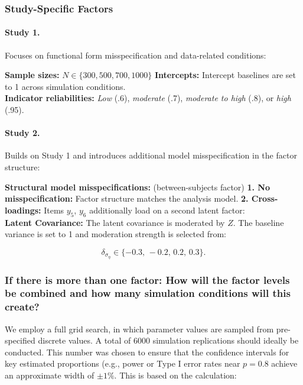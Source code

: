 \documentclass[
  man,
  floatsintext]{apa7}
\begin{document}
\subsubsection{Study-Specific Factors}\label{study-specific-factors}

\paragraph{Study 1.}\label{study-1.}

Focuses on functional form misspecification and data-related conditions:

\textbf{Sample sizes:} \(N \in \{300, 500, 700, 1000\}\)
\textbf{Intercepts:} Intercept baselines are set to 1 across simulation
conditions.\\
\textbf{Indicator reliabilities:} \emph{Low} (.6), \emph{moderate} (.7),
\emph{moderate to high} (.8), or \emph{high} (.95).

\paragraph{Study 2.}\label{study-2.}

Builds on Study 1 and introduces additional model misspecification in
the factor structure:

\textbf{Structural model misspecifications:} (between-subjects factor)
\textbf{1. No misspecification:} Factor structure matches the analysis
model. \textbf{2. Cross-loadings:} Items \(y_5\), \(y_6\) additionally
load on a second latent factor:\\
\textbf{Latent Covariance:} The latent covariance is moderated by \(Z\).
The baseline variance is set to 1 and moderation strength is selected
from:

\[
\delta_{\sigma_\eta} \in \{-0.3,\,-0.2,\,0.2,\,0.3\}.
\]

\subsubsection{If there is more than one factor: How will the factor
levels be combined and how many simulation conditions will this
create?}\label{if-there-is-more-than-one-factor-how-will-the-factor-levels-be-combined-and-how-many-simulation-conditions-will-this-create}

We employ a full grid search, in which parameter values are sampled from
pre-specified discrete values. A total of 6000 simulation replications
should ideally be conducted. This number was chosen to ensure that the
confidence intervals for key estimated proportions (e.g., power or Type
I error rates near \(p = 0.8\) achieve an approximate width of
\(\pm 1\%\). This is based on the calculation:
\end{document}
